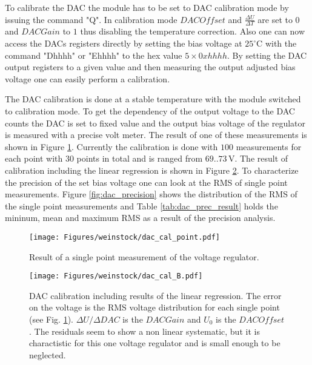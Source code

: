 \documentclass[]{article}
\begin{document}
To calibrate the DAC the module has to be set to DAC calibration mode by issuing the command "Q". In calibration mode $DACOffset$ and $\frac{\Delta U}{\Delta T}$ 
are set to $0$ and $DACGain$ to $1$ thus disabling the temperature correction. Also one can now access the DACs registers directly by setting the bias voltage 
at $25^{\circ} \text{C}$ with the command "Dhhhh" or "Ehhhh" to the hex value $5\times0xhhhh$. By setting the DAC output registers to a given value and then measuring the 
output adjusted bias voltage one can easily perform a calibration.

The DAC calibration is done at a stable temperature with the module switched to calibration mode. To get the dependency of the output voltage to the DAC counts the DAC is set to fixed value and 
the output bias voltage of the regulator is measured with a precise volt meter. The result of one of these measurements is shown in Figure \ref{fig:dac_cal_single_shot}. Currently the calibration is
done with $100$ measurements for each point with $30$ points in total and is ranged from $69..73\,\text{V}$. The result of calibration including the linear regression is shown in Figure 
\ref{fig:dac_cal_total}. To characterize the precision of the set bias voltage one can look at the RMS of single point measurements. Figure \ref{fig:dac_precision} shows the distribution of the RMS 
of the single point measurements and Table \ref{tab:dac_prec_result} holds the mininum, mean and maximum RMS as a result of the precision analysis.

	\begin{figure}[t]
		\centering
			\texttt{[image: Figures/weinstock/dac\_cal\_point.pdf]}
		\caption{Result of a single point measurement of the voltage regulator.}
		\label{fig:dac_cal_single_shot}
	\end{figure}	
	
	\begin{figure}[t]
		\centering
			\texttt{[image: Figures/weinstock/dac\_cal\_B.pdf]}
		\caption{DAC calibration including results of the linear regression. The error on the voltage is the RMS voltage distribution for each single point 
			(see Fig. \ref{fig:dac_cal_single_shot}). 
			$\Delta U / \Delta DAC$ is the $DACGain$ and $U_0$ is the $DACOffset$. The residuals seem to show a non linear
			systematic, but it is charactistic for this one voltage regulator and is small enough to be neglected.}
		\label{fig:dac_cal_total}
	\end{figure}	
	
\end{document}
